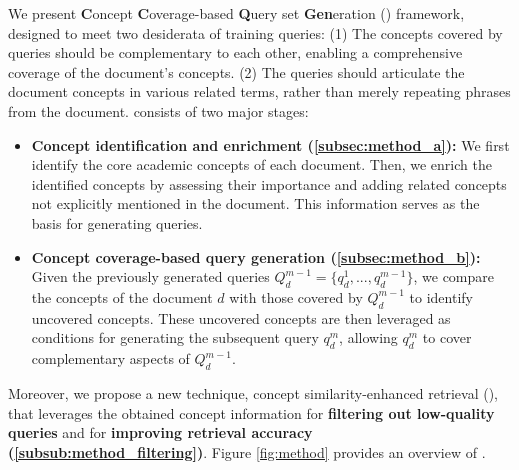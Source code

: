 We present \textbf{C}oncept \textbf{C}overage-based \textbf{Q}uery set \textbf{Gen}eration (\proposed) framework, designed to meet two desiderata of training queries:
(1) The concepts covered by queries should be complementary to each other, enabling a comprehensive coverage of the document’s concepts.
(2) The queries should articulate the document concepts in various related terms, rather than merely repeating phrases from the document.
\proposed consists of two major stages:
\begin{itemize}[leftmargin=*]\vspace{-\topsep}
    \item \textbf{Concept identification and enrichment (\cref{subsec:method_a}):}
        We first identify the core academic concepts of each document.
        Then, we enrich the identified concepts by assessing their importance and adding related concepts not explicitly mentioned in the document.
        This information serves as the basis for generating queries.
    \item \textbf{Concept coverage-based query generation (\cref{subsec:method_b}):}
        Given the previously generated queries $Q^{m-1}_d = \{q^1_d, ..., q^{m-1}_d\}$, we compare the concepts of the document $d$ with those covered by $Q^{m-1}_d$ to identify uncovered concepts.
        These uncovered concepts are then leveraged as conditions for generating the subsequent query $q^{m}_d$, allowing $q^{m}_d$ to cover complementary aspects of $Q^{m-1}_d$.
\end{itemize}\vspace{-\topsep}
Moreover, we propose a new technique, concept similarity-enhanced retrieval (\proposedtwo), that leverages the obtained concept information for \textbf{filtering out low-quality queries} and for \textbf{improving retrieval accuracy (\cref{subsub:method_filtering})}.
Figure \ref{fig:method} provides an overview of \proposed.





